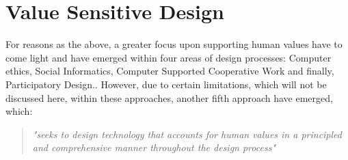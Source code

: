 
\section{Value Sensitive Design}
\label{subsec:vsd_framework}
For reasons as the above, a greater focus upon supporting human values have to come light and have emerged within four areas of design processes: Computer ethics, Social Informatics, Computer Supported Cooperative Work and finally, Participatory Design.\citep[p. 3]{FriedmanVSDandIS}. However, due to certain limitations, which will not be discussed here, within these approaches, another fifth approach have emerged, which: 
\begin{quotation}
\textit{"seeks to design technology that accounts for human values in a principled and comprehensive manner throughout the design process"} \citep[p. 1186]{HumanValuesEthicsAndDesign}
\end{quotation}

